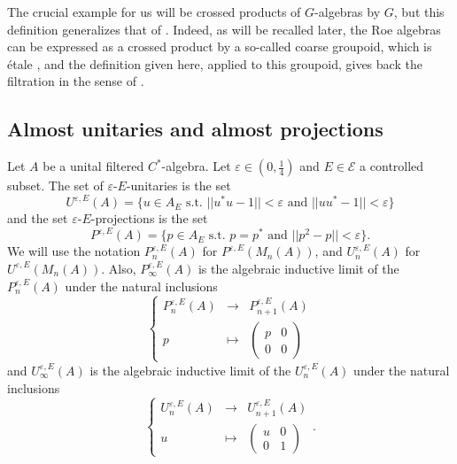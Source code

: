 The crucial example for us will be crossed products of $G$-algebras by $G$, but this definition generalizes that of \cite{OY2}. Indeed, as will be recalled later, the Roe algebras can be expressed as a crossed product by a so-called coarse groupoid, which is étale \cite{SkTuYu}, and the definition given here, applied to this groupoid, gives back the filtration in the sense of \cite{OY2}.

\subsection{Almost unitaries and almost projections}

\begin{definition}
Let $A$ be a unital filtered $C^*$-algebra. Let $\varepsilon\in(0,\frac{1}{4})$ and $E\in \mathcal E$ a controlled subset. The set of $\varepsilon$-$E$-unitaries is the set 
\[U^{\varepsilon, E}(A)= \{u\in A_E \text{ s.t. } ||u^*u-1||<\varepsilon\text{ and }||uu^*-1||<\varepsilon \}\]
and the set $\varepsilon$-$E$-projections is the set 
\[P^{\varepsilon, E}(A)= \{p\in A_E \text{ s.t. } p=p^*\text{ and }||p^2-p||<\varepsilon \}.\]
We will use the notation $P_n^{\varepsilon, E}(A)$ for $P^{\varepsilon, E}(M_n(A))$, and $U_n^{\varepsilon, E}(A)$ for $U^{\varepsilon, E}(M_n(A))$. Also, $P_\infty^{\varepsilon, E}(A)$ is the algebraic inductive limit of the $P_n^{\varepsilon, E}(A)$ under the natural inclusions
\[\left\{\begin{array}{rcl}
	P^{\varepsilon,E}_n(A) 		& \rightarrow	& P^{\varepsilon,E}_{n+1}(A)\\ 
	p 		& \mapsto 	& \begin{pmatrix}p& 0 \\ 0&0 \end{pmatrix}
\end{array}\right.\]
and $U_\infty^{\varepsilon, E}(A)$ is the algebraic inductive limit of the $U_n^{\varepsilon, E}(A)$ under the natural inclusions
\[\left\{\begin{array}{rcl}
	U^{\varepsilon,E}_n(A) 		& \rightarrow	& U^{\varepsilon,E}_{n+1}(A)\\ 
	u 		& \mapsto 	& \begin{pmatrix}u & 0 \\ 0& 1 \end{pmatrix}
\end{array}\right. .\]
\end{definition}

